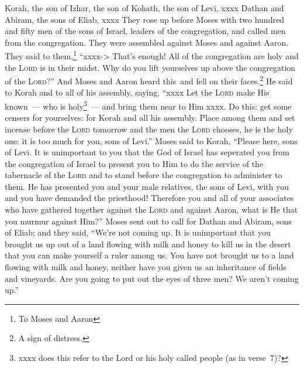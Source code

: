 
\begin{inparaenum}
     Korah, the son of Izhar, the son of Kohath, the son of Levi, xxxx Dathan and Abiram, the sons of Eliab, xxxx%
     They rose up before Moses with two hundred and fifty men of the sons of Israel, leaders of the congregation, and called men from the congregation.%
     They were assembled against Moses and against Aaron. They said to them,\footnote{To Moses and Aaron} ``xxxx-> That's enough! All of the congregation are holy and the \textsc{Lord} is in their midst. Why do you lift yourselves up above the congregation of the \textsc{Lord}?''%
     And Moses and Aaron heard this\understood\ and fell on their faces.\footnote{A sign of distress.}%
     He said to Korah and to all of his assembly, saying, ``xxxx Let the \textsc{Lord} make His known~--- who is holy\footnote{xxxx does this refer to the Lord or his holy called people (as in verse~7)?}~--- and bring them near to Him xxxx.%
     Do this: get some censers for yourselves: for Korah and all his assembly.%
     Place among them and set incense before the \textsc{Lord} tomorrow and the men the \textsc{Lord} chooses, he is the holy one: it is too much for you, sons of Levi.''%
     Moses said to Korah, ``Please here, sons of Levi.%
     It is unimportant to you that the God of Israel has seperated you from the congregation of Israel to present you to Him to do the service of the tabernacle of the \textsc{Lord} and to stand before the congregation to administer to them.%
     He has presented you and your male relatives, the sons of Levi, with you and you have demanded the priesthood!%
     Therefore you and all of your associates who have gathered together against the \textsc{Lord} and against Aaron, what is He that you murmur against Him?''%
     Moses sent out to call for Dathan and Abiram, sons of Eliab; and they said, ``We're not coming up.%
     It is unimportant that you brought us up out of a land flowing with milk and honey to kill us in the desert that you can make yourself a ruler among us.%
     You have not brought us to a land flowing with milk and honey, neither have you given us an inheritance of fields and vineyards. Are you going to put out the eyes of three men? We aren't coming up.''%

\end{inparaenum}
